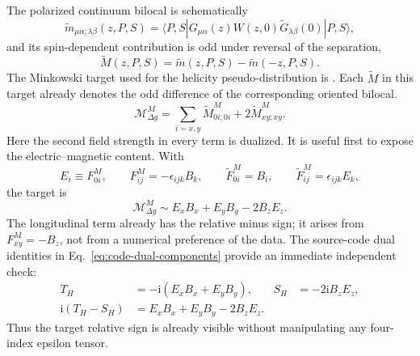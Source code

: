 \documentclass[11pt]{article}
\numberwithin{equation}{section}
\newcommand{\ii}{\mathrm{i}}
\begin{document}
The polarized continuum bilocal is schematically
\begin{equation}
  \widetilde m_{\mu\alpha;\lambda\beta}(z,P,S)
  =\langle P,S|G_{\mu\alpha}(z)W(z,0)
      \widetilde G_{\lambda\beta}(0)|P,S\rangle,
  \label{eq:gluon-helicity-bilocal}
\end{equation}
and its spin-dependent contribution is odd under reversal of the separation,
\begin{equation}
  \widetilde M(z,P,S)=\widetilde m(z,P,S)
                     -\widetilde m(-z,P,S).
  \label{eq:helicity-odd-z}
\end{equation}
The Minkowski target used for the helicity pseudo-distribution is
\cite{BalitskyMorrisRadyushkin2022,EgererEtAl2022GluonHelicity}.
Each \(\widetilde M\) in this target already denotes the odd difference
of the corresponding oriented bilocal.
\begin{equation}
 \mathcal M_{\Delta g}^M
 =\sum_{i=x,y}\widetilde M^M_{0i;0i}
  +2\widetilde M^M_{xy;xy}.
 \label{eq:minkowski-helicity-target}
\end{equation}
Here the second field strength in every term is dualized.  It is useful first
to expose the electric--magnetic content.  With
\begin{equation}
 E_i\equiv F^M_{0i},\qquad
 F^M_{ij}=-\epsilon_{ijk}B_k,\qquad
 \widetilde F^M_{0i}=B_i,\qquad
 \widetilde F^M_{ij}=\epsilon_{ijk}E_k,
 \label{eq:minkowski-electric-magnetic}
\end{equation}
the target is
\begin{equation}
 \mathcal M_{\Delta g}^M
 \sim E_xB_x+E_yB_y-2B_zE_z.
 \label{eq:helicity-eb-check}
\end{equation}
The longitudinal term already has the relative minus sign; it arises from
\(F^M_{xy}=-B_z\), not from a numerical preference of the data.
The source-code dual identities in
Eq.~\eqref{eq:code-dual-components} provide an immediate independent check:
\begin{align}
 T_H
 &=-\ii\left(E_xB_x+E_yB_y\right),&
 S_H&=-2\ii B_zE_z,\nonumber\\
 \ii(T_H-S_H)
 &=E_xB_x+E_yB_y-2B_zE_z.
 \label{eq:code-helicity-eb-map}
\end{align}
Thus the target relative sign is already visible without manipulating any
four-index epsilon tensor.
\end{document}
